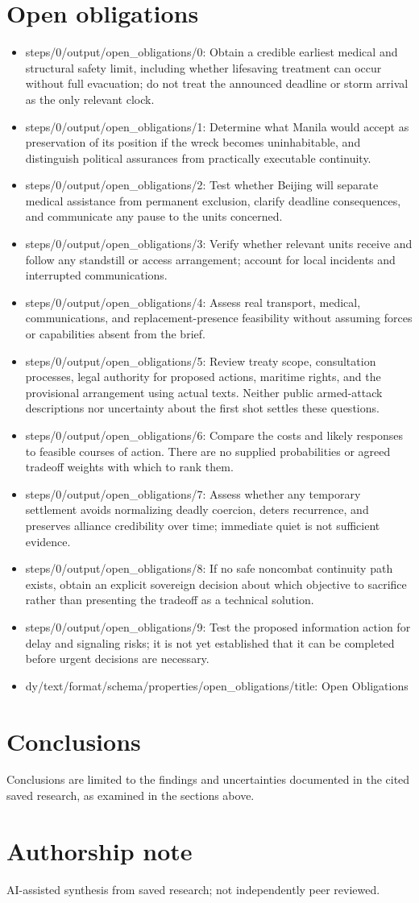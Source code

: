 \documentclass[11pt]{article}
\begin{document}
\section{Open obligations}
\begin{itemize}
\item steps/0/output/open\_obligations/0: Obtain a credible earliest medical and structural safety limit, including whether lifesaving treatment can occur without full evacuation; do not treat the announced deadline or storm arrival as the only relevant clock.
\item steps/0/output/open\_obligations/1: Determine what Manila would accept as preservation of its position if the wreck becomes uninhabitable, and distinguish political assurances from practically executable continuity.
\item steps/0/output/open\_obligations/2: Test whether Beijing will separate medical assistance from permanent exclusion, clarify deadline consequences, and communicate any pause to the units concerned.
\item steps/0/output/open\_obligations/3: Verify whether relevant units receive and follow any standstill or access arrangement; account for local incidents and interrupted communications.
\item steps/0/output/open\_obligations/4: Assess real transport, medical, communications, and replacement-presence feasibility without assuming forces or capabilities absent from the brief.
\item steps/0/output/open\_obligations/5: Review treaty scope, consultation processes, legal authority for proposed actions, maritime rights, and the provisional arrangement using actual texts. Neither public armed-attack descriptions nor uncertainty about the first shot settles these questions.
\item steps/0/output/open\_obligations/6: Compare the costs and likely responses to feasible courses of action. There are no supplied probabilities or agreed tradeoff weights with which to rank them.
\item steps/0/output/open\_obligations/7: Assess whether any temporary settlement avoids normalizing deadly coercion, deters recurrence, and preserves alliance credibility over time; immediate quiet is not sufficient evidence.
\item steps/0/output/open\_obligations/8: If no safe noncombat continuity path exists, obtain an explicit sovereign decision about which objective to sacrifice rather than presenting the tradeoff as a technical solution.
\item steps/0/output/open\_obligations/9: Test the proposed information action for delay and signaling risks; it is not yet established that it can be completed before urgent decisions are necessary.
\item dy/text/format/schema/properties/open\_obligations/title: Open Obligations
\end{itemize}
\section{Conclusions}
Conclusions are limited to the findings and uncertainties documented in the cited saved research, as examined in the sections above.

\section*{Authorship note}
AI-assisted synthesis from saved research; not independently peer reviewed.
\end{document}
